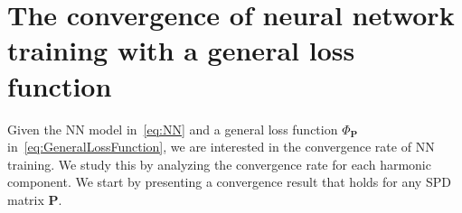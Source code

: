 \documentclass{article} %
\begin{document}
\section{The convergence of neural network training with a general loss function}\label{sec:general}
Given the NN model in~\cref{eq:NN} and a general loss function $\Phi_{\mathbf{P}}$ in~\cref{eq:GeneralLossFunction}, we are interested in the convergence rate of NN training. We study this by analyzing the convergence rate for each harmonic component. We start by presenting a convergence result that holds for any SPD matrix $\mathbf{P}$. 
\end{document}
